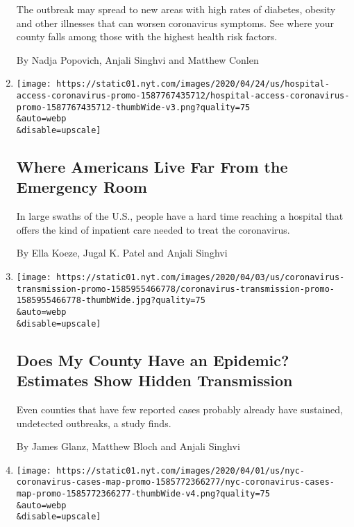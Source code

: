 \begin{enumerate}
  The outbreak may spread to new areas with high rates of diabetes,
  obesity and other illnesses that can worsen coronavirus symptoms. See
  where your county falls among those with the highest health risk
  factors.

  By Nadja Popovich, Anjali Singhvi and Matthew Conlen
\item
  \href{/interactive/2020/04/26/us/us-hospital-access-coronavirus.html}{}

  \texttt{[image: https://static01.nyt.com/images/2020/04/24/us/hospital-access-coronavirus-promo-1587767435712/hospital-access-coronavirus-promo-1587767435712-thumbWide-v3.png?quality=75\\\&auto=webp\\\&disable=upscale]}

  \hypertarget{where-americans-live-far-from-the-emergency-room}{%
  \subsection{Where Americans Live Far From the Emergency
  Room}\label{where-americans-live-far-from-the-emergency-room}}

  In large swaths of the U.S., people have a hard time reaching a
  hospital that offers the kind of inpatient care needed to treat the
  coronavirus.

  By Ella Koeze, Jugal K. Patel and Anjali Singhvi
\item
  \href{/interactive/2020/04/03/us/coronavirus-county-epidemics.html}{}

  \texttt{[image: https://static01.nyt.com/images/2020/04/03/us/coronavirus-transmission-promo-1585955466778/coronavirus-transmission-promo-1585955466778-thumbWide.jpg?quality=75\\\&auto=webp\\\&disable=upscale]}

  \hypertarget{does-my-county-have-an-epidemic-estimates-show-hidden-transmission}{%
  \subsection{Does My County Have an Epidemic? Estimates Show Hidden
  Transmission}\label{does-my-county-have-an-epidemic-estimates-show-hidden-transmission}}

  Even counties that have few reported cases probably already have
  sustained, undetected outbreaks, a study finds.

  By James Glanz, Matthew Bloch and Anjali Singhvi
\item
  \href{/interactive/2020/04/01/nyregion/nyc-coronavirus-cases-map.html}{}

  \texttt{[image: https://static01.nyt.com/images/2020/04/01/us/nyc-coronavirus-cases-map-promo-1585772366277/nyc-coronavirus-cases-map-promo-1585772366277-thumbWide-v4.png?quality=75\\\&auto=webp\\\&disable=upscale]}


\end{enumerate}
